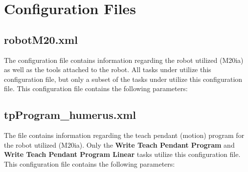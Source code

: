 \documentclass[letterpaper]{article}
\begin{document}
\section{Configuration Files}
\subsection{robotM20.xml}
The  configuration file contains information regarding the robot utilized (M20ia) as well as the tools attached to the robot. All tasks under  utilize this configuration file, but only a subset of the tasks under  utilize this configuration file. This configuration file contains the following parameters:
\begin{sortedlist}
	\sortitem[humerusToolFrame]{\humerusToolFrame}
	\sortitem[hsToolFrame]{\hsToolFrame}
	\sortitem[velLimits]{\velLimits}
	\sortitem[urdf]{\urdf}
	\sortitem[base]{\base}
	\sortitem[ee]{\ee}
\end{sortedlist}

\subsection{tpProgram\_humerus.xml}
The  file contains information regarding the teach pendant (motion) program for the robot utilized (M20ia). Only the \textbf{Write Teach Pendant Program} and \textbf{Write Teach Pendant Program Linear} tasks utilize this configuration file. This configuration file contains the following parameters:
\begin{sortedlist}
	\sortitem[tpProgramTimer]{\tpProgramTimer}
	\sortitem[tpProgramUTool]{\tpProgramUTool}
	\sortitem[tpProgramUFrame]{\tpProgramUFrame}
	\sortitem[tpProgramCntTag]{\tpProgramCntTag}
\end{sortedlist}
\end{document}
